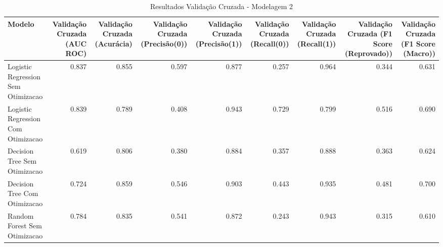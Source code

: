 \begin{table}[H] %
    \centering
    \caption{Resultados Validação Cruzada - Modelagem 2}
    \label{tab:resultados_cv_modelagem_2}
    \renewcommand{\arraystretch}{1.25} %
    \begin{adjustwidth}{ -1in }{ -1in } %
    \centering %
    \small %
    \begin{tabular}{lrrrrrrrr}
\toprule
                            Modelo &  Validação Cruzada (AUC ROC) &  Validação Cruzada (Acurácia) &  Validação Cruzada (Precisão(0)) &  Validação Cruzada (Precisão(1)) &  Validação Cruzada (Recall(0)) &  Validação Cruzada (Recall(1)) &  Validação Cruzada (F1 Score (Reprovado)) &  Validação Cruzada (F1 Score (Macro)) \\
\midrule
Logistic Regression Sem Otimizacao &                        0.837 &                         0.855 &                            0.597 &                            0.877 &                          0.257 &                          0.964 &                                     0.344 &                                 0.631 \\
Logistic Regression Com Otimizacao &                        0.839 &                         0.789 &                            0.408 &                            0.943 &                          0.729 &                          0.799 &                                     0.516 &                                 0.690 \\
      Decision Tree Sem Otimizacao &                        0.619 &                         0.806 &                            0.380 &                            0.884 &                          0.357 &                          0.888 &                                     0.363 &                                 0.624 \\
      Decision Tree Com Otimizacao &                        0.724 &                         0.859 &                            0.546 &                            0.903 &                          0.443 &                          0.935 &                                     0.481 &                                 0.700 \\
      Random Forest Sem Otimizacao &                        0.784 &                         0.835 &                            0.541 &                            0.872 &                          0.243 &                          0.943 &                                     0.315 &                                 0.610 \\

\end{tabular}
\end{adjustwidth}
\end{table}

